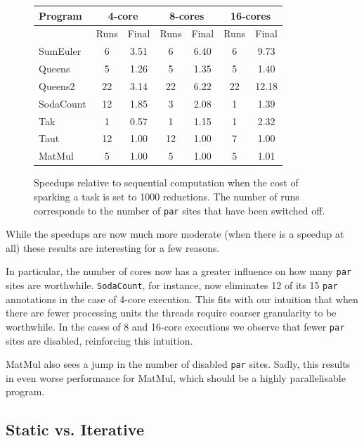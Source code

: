 \begin{figure}[ht]
\centering
  \begin{tabular}{ |l||c c|c c|c c| }
    \hline
    Program & \multicolumn{2}{c|}{4-core} & \multicolumn{2}{c|}{8-cores} & \multicolumn{2}{c|}{16-cores} \\
    \hline
            & Runs & Final     & Runs & Final      & Runs & Final \\
    \hline
    SumEuler  & 6    & 3.51      & 6    & 6.40       & 6    & 9.73     \\
    Queens    & 5    & 1.26      & 5    & 1.35       & 5    & 1.40  \\
    Queens2   & 22   & 3.14      & 22   & 6.22       & 22   & 12.18  \\
    SodaCount & 12   & 1.85      & 3    & 2.08       & 1    & 1.39    \\
    Tak       & 1    & 0.57      & 1    & 1.15       & 1    & 2.32   \\
    Taut      & 12   & 1.00      & 12   & 1.00       & 7    & 1.00  \\
    MatMul    & 5    & 1.00      & 5    & 1.00       & 5    & 1.01   \\
    \hline
  \end{tabular}
\caption{Speedups relative to sequential computation when the cost of sparking
        a task is set to 1000 reductions. The number of runs corresponds to the
        number of \texttt{par} sites that have been switched off.}
\label{table1000}
\end{figure}

While the speedups are now much more moderate (when there is a speedup at all)
these results are interesting for a few reasons.

In particular, the number of cores now has a greater influence on how many
\verb-par- sites are worthwhile.  \texttt{SodaCount}, for instance, now eliminates 12 of
its 15 \verb-par- annotations in the case of 4-core execution. This fits with
our intuition that when there are fewer processing units the threads require
coarser granularity to be worthwhile. In the cases of 8 and 16-core executions
we observe that fewer \verb-par- sites are disabled, reinforcing this
intuition.

MatMul also sees a jump in the number of disabled \verb-par- sites. Sadly, this
results in even worse performance for MatMul, which should be a highly
parallelisable program.

\subsection*{Static vs. Iterative}

